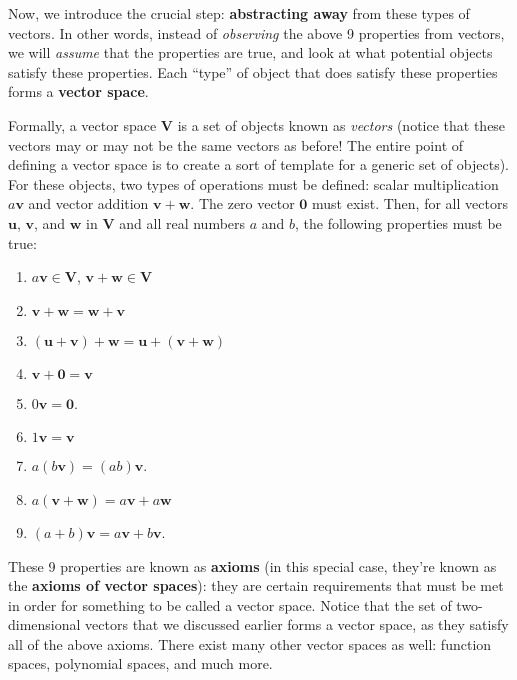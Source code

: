 \documentclass{article}
\begin{document}
\begin{multicols}{3}
Now, we introduce the crucial step: \textbf{abstracting away} from these types of vectors. In other words, instead of \textit{observing} the above 9 properties from vectors, we will \textit{assume} that the properties are true, and look at what potential objects satisfy these properties. Each ``type'' of object that does satisfy these properties forms a \textbf{vector space}.

Formally, a vector space $\mathbf{V}$ is a set of objects known as \textit{vectors} (notice that these vectors may or may not be the same vectors as before! The entire point of defining a vector space is to create a sort of template for a generic set of objects). For these objects, two types of operations must be defined: scalar multiplication $a\mathbf{v}$ and vector addition $\mathbf{v}+\mathbf{w}$. The zero vector $\mathbf{0}$ must exist. Then, for all vectors $\mathbf{u}$, $\mathbf{v}$, and $\mathbf{w}$ in $\mathbf{V}$ and all real numbers $a$ and $b$, the following properties must be true:

\begin{enumerate}
    \item $a\mathbf{v}\in\mathbf{V}$, $\mathbf{v}+\mathbf{w}\in\mathbf{V}$

    \item $\mathbf{v}+\mathbf{w}=\mathbf{w}+\mathbf{v}$

    \item $(\mathbf{u}+\mathbf{v})+\mathbf{w}=\mathbf{u}+(\mathbf{v}+\mathbf{w})$

    \item $\mathbf{v}+\mathbf{0}=\mathbf{v}$

    \item $0\mathbf{v}=\mathbf{0}$.

    \item $1\mathbf{v}=\mathbf{v}$

    \item $a(b\mathbf{v})=(ab)\mathbf{v}$.

    \item $a(\mathbf{v}+\mathbf{w})=a\mathbf{v}+a\mathbf{w}$

    \item $(a+b)\mathbf{v}=a\mathbf{v}+b\mathbf{v}$.
\end{enumerate}

These 9 properties are known as \textbf{axioms} (in this special case, they're known as the \textbf{axioms of vector spaces}): they are certain requirements that must be met in order for something to be called a vector space. Notice that the set of two-dimensional vectors that we discussed earlier forms a vector space, as they satisfy all of the above axioms. There exist many other vector spaces as well: function spaces, polynomial spaces, and much more.


\end{multicols}
\end{document}
